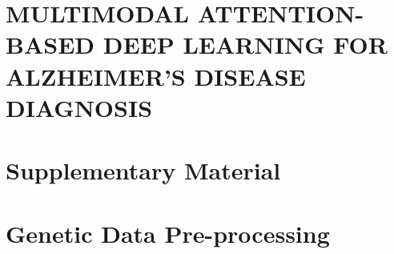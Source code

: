\renewcommand{\thesection}{S\arabic{section}}
\renewcommand{\thefigure}{S\arabic{figure}}
\renewcommand{\thetable}{S\arabic{table}}
\setcounter{section}{0}
\setcounter{figure}{0}
\setcounter{table}{0}

\section*{MULTIMODAL ATTENTION-BASED DEEP LEARNING FOR ALZHEIMER'S DISEASE DIAGNOSIS}

\section*{Supplementary Material}
\label{section:supp-materials}


\section{Genetic Data Pre-processing}
\label{section:genetic}
